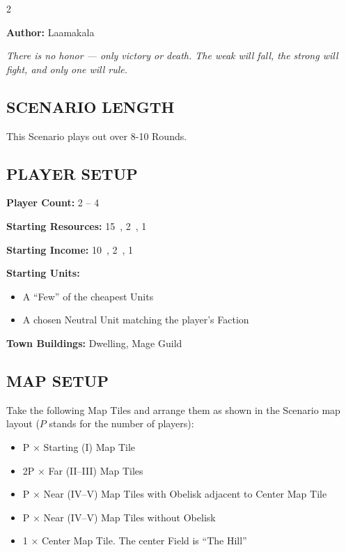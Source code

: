 
\begin{multicols*}{2}

\textbf{Author:} Laamakala

\textit{There is no honor — only victory or death. The weak will fall, the strong will fight, and only one will rule.}

\subsection*{\MakeUppercase{Scenario Length}}
This Scenario plays out over 8-10 Rounds.

\subsection*{\MakeUppercase{Player Setup}}
\textbf{Player Count:} 2 -- 4

\textbf{Starting Resources:} 15~, 2~, 1~

\textbf{Starting Income:} 10~, 2~, 1~

\textbf{Starting Units:}
\begin{itemize}
  \item A ``Few'' of the cheapest  Units
  \item A chosen Neutral  Unit matching the player's Faction
\end{itemize}

\textbf{Town Buildings:}  Dwelling, Mage Guild

\subsection*{\MakeUppercase{Map Setup}}
Take the following Map Tiles and arrange them as shown in the Scenario map layout ($P$ stands for the number of players):

\begin{itemize}
  \item P × Starting (I) Map Tile
  \item 2P × Far (II--III) Map Tiles
  \item P × Near (IV--V) Map Tiles with Obelisk adjacent to Center Map Tile
  \item P × Near (IV--V) Map Tiles without Obelisk
  \item 1 × Center Map Tile. The center Field is ``The Hill''
\end{itemize}


\end{multicols*}
